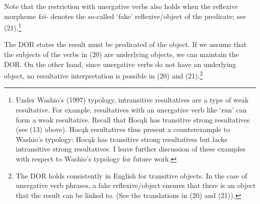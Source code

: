 \documentclass[output=paper]{LSP/langsci}
\begin{document}
\begin{exe}
\ex
\begin{xlist}



\end{xlist}
\end{exe}

Note that the restriction with unergative verbs also holds when the reflexive morpheme \textit{kii-} denotes the so-called `fake' reflexive/object of the predicate; see (21).\footnote{Under Washio's (1997) typology, intransitive resultatives are a type of weak resultative. For example, resultatives with an unergative verb like `run' can form a weak resultative. Recall that Hocąk has transitive strong resultatives (see (13) above). Hocąk resultatives thus present a counterexample to Washio's typology: Hocąk has transitive strong resultatives but lacks intransitive strong resultatives. I leave further discussion of these examples with respect to Washio's typology for future work.}

\begin{exe}


\end{exe}

The DOR states the result must be predicated of the object. If we assume that the subjects of the verbs in (20) are underlying objects, we can maintain the DOR. On the other hand, since unergative verbs do not have an underlying object, no resultative interpretation is possible in (20) and (21).\footnote{The DOR holds consistently in English for transitive objects. In the case of unergative verb phrases, a fake reflexive/object ensures that there is an object that the result can be linked to. (See the translations in (20) and (21)).}
\end{document}
